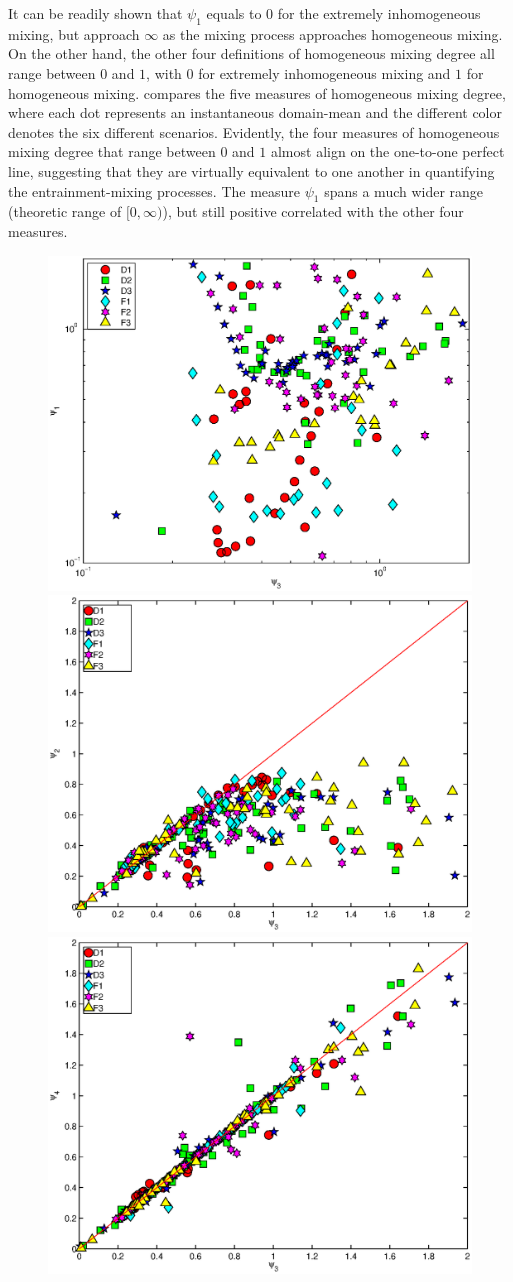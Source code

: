 \documentclass[draft,jgrga]{AGUTeX}
\begin{document}
\begin{article}
It can be readily shown that $\psi_1$ equals to $0$ for the extremely inhomogeneous mixing, but 
approach $\infty$ as the mixing process approaches homogeneous mixing. On the other hand, the 
other four definitions of homogeneous mixing degree all range between $0$ and $1$, with $0$ for 
extremely inhomogeneous mixing and $1$ for homogeneous mixing. 
 compares the five measures of homogeneous mixing degree, where each dot represents an 
instantaneous domain-mean and the different color denotes the six different scenarios.
Evidently, the four measures of homogeneous mixing degree that range between $0$ and $1$ almost align on the one-to-one perfect line, suggesting that they are virtually equivalent to one another in quantifying the entrainment-mixing processes. The measure $\psi_1$ spans a much wider range (theoretic range of $[0, \infty)$), but still positive correlated with the other four measures.
\begin{figure}[!htbp]\centering
\includegraphics[width=0.45\linewidth]{Figures/phi3_phi1}
\includegraphics[width=0.45\linewidth]{Figures/phi3_phi2}\\
\includegraphics[width=0.45\linewidth]{Figures/phi3_phi4}

\end{figure}
\end{article}
\end{document}
